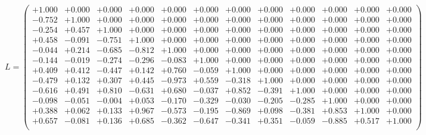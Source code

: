 \documentclass[9pt]{article}
\theoremstyle{plain}
\theoremstyle{definition}
\theoremstyle{remark}
\numberwithin{equation}{section}
\begin{document}
$L = \left(
\begin{array}{
cccccccccccc}
+1.000 & +0.000 & +0.000 & +0.000 & +0.000 & +0.000 & +0.000 & +0.000 & +0.000 & +0.000 & +0.000 & +0.000 \\
-0.752 & +1.000 & +0.000 & +0.000 & +0.000 & +0.000 & +0.000 & +0.000 & +0.000 & +0.000 & +0.000 & +0.000 \\
-0.254 & +0.457 & +1.000 & +0.000 & +0.000 & +0.000 & +0.000 & +0.000 & +0.000 & +0.000 & +0.000 & +0.000 \\
+0.458 & -0.091 & -0.751 & +1.000 & +0.000 & +0.000 & +0.000 & +0.000 & +0.000 & +0.000 & +0.000 & +0.000 \\
-0.044 & +0.214 & -0.685 & -0.812 & +1.000 & +0.000 & +0.000 & +0.000 & +0.000 & +0.000 & +0.000 & +0.000 \\
-0.144 & -0.019 & -0.274 & -0.296 & -0.083 & +1.000 & +0.000 & +0.000 & +0.000 & +0.000 & +0.000 & +0.000 \\
+0.409 & +0.412 & -0.447 & +0.142 & +0.760 & -0.059 & +1.000 & +0.000 & +0.000 & +0.000 & +0.000 & +0.000 \\
-0.479 & +0.132 & +0.307 & +0.445 & -0.973 & +0.559 & -0.318 & +1.000 & +0.000 & +0.000 & +0.000 & +0.000 \\
-0.616 & +0.491 & +0.810 & -0.631 & +0.680 & -0.037 & +0.852 & -0.391 & +1.000 & +0.000 & +0.000 & +0.000 \\
-0.098 & -0.051 & -0.004 & +0.053 & -0.170 & -0.329 & -0.030 & -0.205 & -0.285 & +1.000 & +0.000 & +0.000 \\
+0.388 & +0.062 & +0.133 & +0.967 & -0.573 & -0.195 & -0.869 & +0.098 & -0.381 & +0.853 & +1.000 & +0.000 \\
+0.657 & -0.081 & +0.136 & +0.685 & -0.362 & -0.647 & -0.341 & +0.351 & -0.059 & -0.885 & +0.517 & +1.000 \\
\end{array}
\right)$ \newline 
\end{document}

